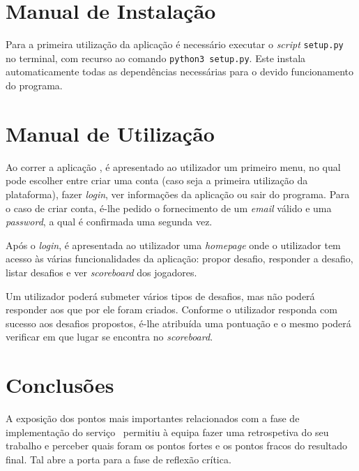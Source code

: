 \section{Manual de Instalação}
\label{sec::implementacao:maninstall}

Para a primeira utilização da aplicação é necessário executar o \textit{script} \verb|setup.py| no terminal, com recurso ao comando \verb|python3 setup.py|. Este instala automaticamente todas as dependências necessárias para o devido funcionamento do programa.


\section{Manual de Utilização}
\label{sec::implementacao:manuser}

Ao correr a aplicação \appname, é apresentado ao utilizador um primeiro menu, no qual pode escolher entre criar uma conta (caso seja a primeira utilização da plataforma), fazer \textit{login}, ver informações da aplicação ou sair do programa.  Para o caso de criar conta, é-lhe pedido o fornecimento de um \textit{email} válido e uma \textit{password}, a qual é confirmada uma segunda vez.

Após o \textit{login}, é apresentada ao utilizador uma \textit{homepage} onde o utilizador tem acesso às várias funcionalidades da aplicação: propor desafio, responder a desafio, listar desafios e ver \textit{scoreboard} dos jogadores.

Um utilizador poderá submeter vários tipos de desafios, mas não poderá responder aos que por ele foram criados. Conforme o utilizador responda com sucesso aos desafios propostos, é-lhe atribuída uma pontuação e o mesmo poderá verificar em que lugar se encontra no \textit{scoreboard}.



\section{Conclusões}
\label{sec::implementacao:concs}

A exposição dos pontos mais importantes relacionados com a fase de implementação do serviço \appname~permitiu à equipa fazer uma retrospetiva do seu trabalho e perceber quais foram os pontos fortes e os pontos fracos do resultado final. Tal abre a porta para a fase de reflexão crítica.

